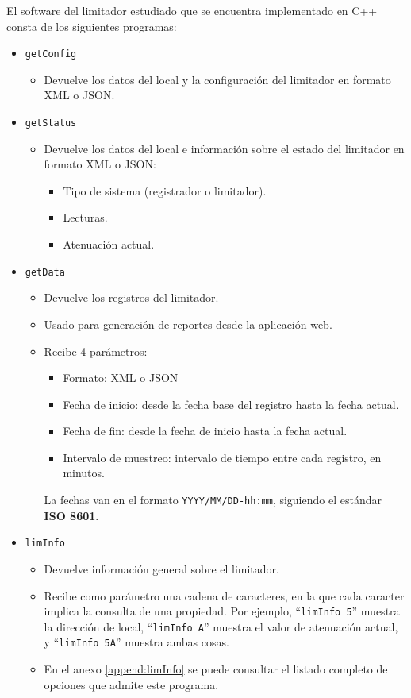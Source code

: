 El software del limitador estudiado que se encuentra implementado en C++ consta de los siguientes programas:
\begin{itemize}
    \item \verb|getConfig|
    \begin{itemize}
        \item Devuelve los datos del local y la configuración del limitador en formato \acrshort{XML} o \acrshort{JSON}.
    \end{itemize}

    \item \verb|getStatus|
    \begin{itemize}
        \item Devuelve los datos del local e información sobre el estado del limitador en formato \acrshort{XML} o \acrshort{JSON}:
        \begin{itemize}
            \item Tipo de sistema (registrador o limitador).
            \item Lecturas.
            \item Atenuación actual.
        \end{itemize}
    \end{itemize}

    \item \verb|getData|
    \begin{itemize}
        \item Devuelve los registros del limitador.
        \item Usado para generación de reportes desde la aplicación web.
        \item Recibe 4 parámetros:
        \begin{itemize}
            \item Formato: \acrshort{XML} o \acrshort{JSON}
            \item Fecha de inicio: desde la fecha base del registro hasta la fecha actual.
            \item Fecha de fin: desde la fecha de inicio hasta la fecha actual.
            \item Intervalo de muestreo: intervalo de tiempo entre cada registro, en minutos.
        \end{itemize}
        \subitem La fechas van en el formato \verb|YYYY/MM/DD-hh:mm|, siguiendo el estándar \textbf{\acrshort{ISO} 8601}.
    \end{itemize}

    \item \verb|limInfo|
    \begin{itemize}
        \item Devuelve información general sobre el limitador.
        \item Recibe como parámetro una cadena de caracteres, en la que cada caracter implica la consulta de una propiedad. Por ejemplo, ``\verb|limInfo 5|'' muestra la dirección de local, ``\verb|limInfo A|'' muestra el valor de atenuación actual, y ``\verb|limInfo 5A|'' muestra ambas cosas.
        \item En el anexo \ref{append:limInfo} se puede consultar el listado completo de opciones que admite este programa.
    \end{itemize}


\end{itemize}
